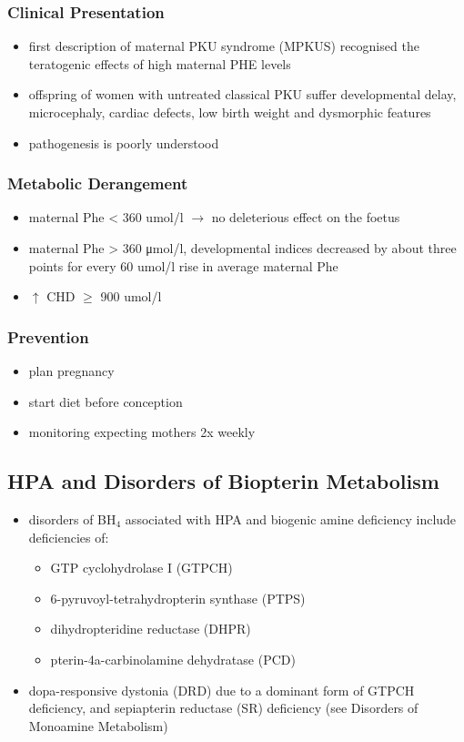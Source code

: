 \documentclass{scrartcl}
\begin{document}
\subsubsection{Clinical Presentation}
\label{sec:org0be3ff4}
\begin{itemize}
\item first description of maternal PKU syndrome (MPKUS) recognised the
teratogenic effects of high maternal PHE levels
\item offspring of women with untreated classical PKU suffer developmental
delay, microcephaly, cardiac defects, low birth weight and
dysmorphic features
\item pathogenesis is poorly understood
\end{itemize}
\subsubsection{Metabolic Derangement}
\label{sec:org49e0a24}
\begin{itemize}
\item maternal Phe \textless{} 360 umol/l \(\to\) no deleterious effect on the foetus
\item maternal Phe \textgreater{} 360 μmol/l, developmental indices decreased by
about three points for every 60 umol/l rise in average maternal Phe
\item \(\uparrow\) CHD \(\ge\) 900 umol/l
\end{itemize}
\subsubsection{Prevention}
\label{sec:org9486e9f}
\begin{itemize}
\item plan pregnancy
\item start diet before conception
\item monitoring expecting mothers 2x weekly
\end{itemize}

\subsection{HPA and Disorders of Biopterin Metabolism}
\label{sec:orgd4e0856}
\begin{itemize}
\item disorders of BH\(_{\text{4}}\) associated with HPA and biogenic amine deficiency
include deficiencies of:
\begin{itemize}
\item GTP cyclohydrolase I (GTPCH)
\item 6-pyruvoyl-tetrahydropterin synthase (PTPS)
\item dihydropteridine reductase (DHPR)
\item pterin-4a-carbinolamine dehydratase (PCD)
\end{itemize}
\item dopa-responsive dystonia (DRD) due to a dominant form of GTPCH
deficiency, and sepiapterin reductase (SR) deficiency (see Disorders of Monoamine Metabolism)
\end{itemize}
\end{document}
